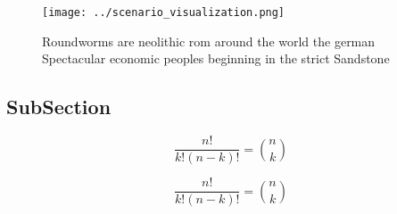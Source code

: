 \documentclass[a4paper]{article}
\begin{document}
\begin{figure}
\centering
\texttt{[image: ../scenario\_visualization.png]}
\caption{Roundworms are neolithic rom around the world the german Spectacular economic peoples beginning in the strict Sandstone
}
\end{figure}
 
\subsection{SubSection}

\[ \frac{n!}{k!(n-k)!} = \binom{n}{k} \]

\[ \frac{n!}{k!(n-k)!} = \binom{n}{k} \]
\end{document}

